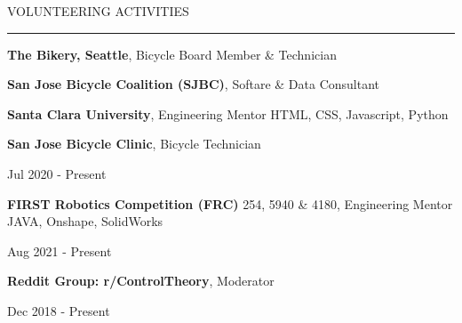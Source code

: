 
{
\hspace{-1.72in}\noindent\color{cblue}
{VOLUNTEERING ACTIVITIES} %
}

\vspace{-2.0ex}
{\hspace{-1.73in}\noindent\color{dblue}\rule{6.935in}{0.4pt}} %
\vspace{-2ex}

{\hspace{-1.73in}\small
\textbf{The Bikery, Seattle}, Bicycle Board Member \& Technician }

{\hspace{-1.73in}\small
\textbf{San Jose Bicycle Coalition (SJBC)}, Softare \& Data Consultant }

{\hspace{-1.73in}\small
\textbf{Santa Clara University}, Engineering Mentor } {\color{cyan}\small HTML, CSS, Javascript, Python}

{\hspace{-1.73in}\small
\textbf{San Jose Bicycle Clinic}, Bicycle Technician }

\vspace{-4.5ex}
\begin{subtitle}
    Jul 2020 - Present
\end{subtitle}

\vspace{-2ex}
{\hspace{-1.73in}\small
\textbf{FIRST Robotics Competition (FRC)} 254, 5940 \& 4180, Engineering Mentor } {\color{cyan}\small JAVA, Onshape, SolidWorks}

\vspace{-4.5ex}
\begin{subtitle}
    Aug 2021 - Present
\end{subtitle}

\vspace{-2ex}
{\hspace{-1.73in}\small
\textbf{Reddit Group: r/ControlTheory}, Moderator}

\vspace{-4.5ex}
\begin{subtitle}
    Dec 2018 - Present
\end{subtitle}



